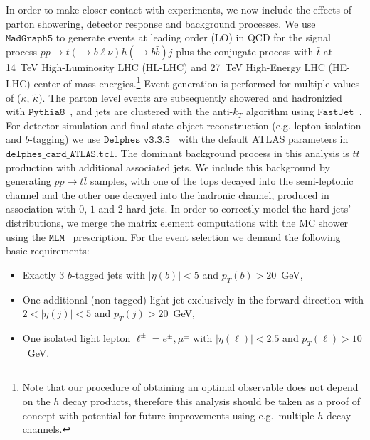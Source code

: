 \documentclass[11pt,a4paper]{article}
\begin{document}
In order to make closer contact with experiments, we now include the effects of parton showering, detector response and background processes. We use $\texttt{MadGraph5}$ to generate events at leading order (LO) in QCD for the signal process $p p \to t (\to b \ell \nu) h (\to b \bar{b}) j$ plus the conjugate process with $\bar t$ at  14~TeV High-Luminosity LHC (HL-LHC) and 27~TeV High-Energy LHC (HE-LHC) center-of-mass energies.\footnote{Note that our procedure of obtaining an optimal observable does not depend on the $h$ decay products, therefore this analysis should be taken as a proof of concept with potential for future improvements using e.g.~multiple $h$ decay channels.} Event generation is performed for multiple values of ($\kappa$, $\tilde{\kappa})$. The parton level events are subsequently showered and hadronizied with $\texttt{Pythia8}$~\cite{Sjostrand:2007gs}, and jets are clustered with the anti-$k_T$ algorithm using $\texttt{FastJet}$~\cite{Cacciari:2011ma}. For detector simulation and final state object reconstruction (e.g. lepton isolation and $b$-tagging) we use $\texttt{Delphes v3.3.3}$~\cite{deFavereau:2013fsa} with the default ATLAS parameters in $\texttt{delphes\_card\_ATLAS.tcl}$. The dominant background process in this analysis is $t\bar t$ production with additional associated jets. We include this background by generating $pp\to t\bar t$ samples, with one of the tops decayed into the semi-leptonic channel and the other one decayed into the hadronic channel, produced in association with $0$, $1$ and $2$ hard jets. In order to correctly model the hard jets' distributions, we merge the matrix element computations with the MC shower using the $\texttt{MLM}$~\cite{Mangano:2006rw} prescription. 
For the event selection we demand the following basic requirements:
\begin{itemize}
\item Exactly $3$ $b$-tagged jets with $|\eta(b)|<5$ and $p_T(b)>20$~GeV,
\item One additional (non-tagged) light jet exclusively in the forward direction with $2<|\eta(j)|<5$ and $p_T(j)>20$~GeV,
\item One isolated light lepton $\ell^\pm=e^\pm,\mu^\pm$ with $|\eta(\ell)|<2.5$ and $p_T(\ell)>10$~GeV.  
\end{itemize}
\end{document}

